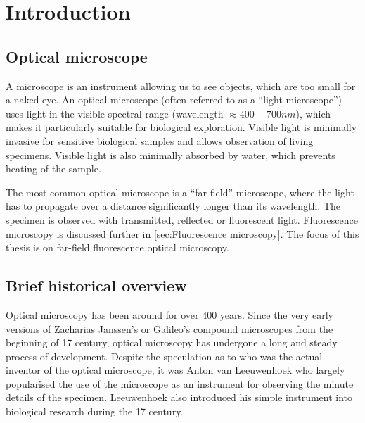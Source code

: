 \chapter{Introduction\label{ch:Introduction}}


\section{Optical microscope} %

A microscope is an instrument allowing us to see objects, which are too small for a naked eye. An optical microscope (often referred to as a ``light microscope'') uses light in the visible spectral range (wavelength $\approx400-700\unit{nm}$), which makes it particularly suitable for biological exploration. Visible light is minimally invasive for sensitive biological samples and allows observation of living specimens. Visible light is also minimally absorbed by water, which prevents heating of the sample.

 The most common optical microscope is a ``far-field'' microscope, where the light has to propagate over a distance significantly longer than its wavelength. The specimen is observed with transmitted, reflected or fluorescent light. Fluorescence microscopy is discussed further in \autoref{sec:Fluorescence microscopy}. The focus of this thesis is on far-field fluorescence optical microscopy.


\section{Brief historical overview}

Optical microscopy has been around for over 400 years. Since the very early versions of Zacharias Janssen's or Galileo's compound microscopes from the beginning of 17\ths{} century, optical microscopy has undergone a long and steady process of development. Despite the speculation as to who was the actual inventor of the optical microscope, it was Anton van Leeuwenhoek who largely popularised the use of the microscope as an instrument for observing the minute details of the specimen. Leeuwenhoek also introduced his simple instrument into biological research during the 17\ths{} century.

